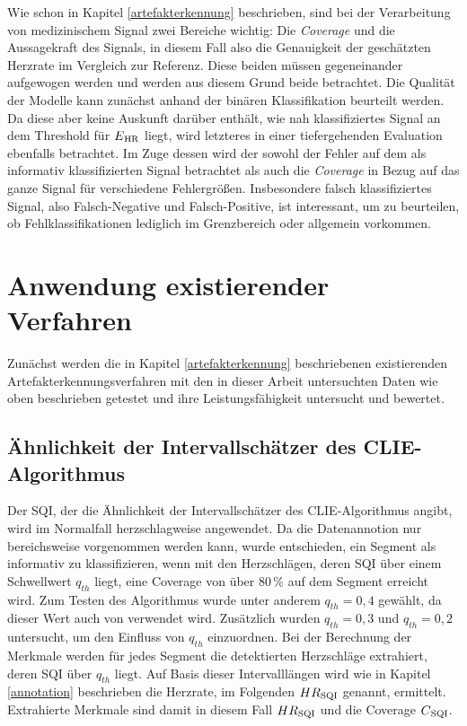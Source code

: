Wie schon in Kapitel \ref{artefakterkennung} beschrieben, sind bei der Verarbeitung von medizinischem Signal zwei Bereiche wichtig: Die \textit{Coverage} und die Aussagekraft des Signals, in diesem Fall also die Genauigkeit der geschätzten Herzrate im Vergleich zur Referenz. Diese beiden müssen gegeneinander aufgewogen werden und werden aus diesem Grund beide betrachtet. Die Qualität der Modelle kann zunächst anhand der binären Klassifikation beurteilt werden. Da diese aber keine Auskunft darüber enthält, wie nah klassifiziertes Signal an dem Threshold für $E\textsubscript{HR}$ liegt, wird letzteres in einer tiefergehenden Evaluation ebenfalls betrachtet. Im Zuge dessen wird der sowohl der Fehler auf dem als informativ klassifizierten Signal betrachtet als auch die \textit{Coverage} in Bezug auf das ganze Signal für verschiedene Fehlergrößen. Insbesondere falsch klassifiziertes Signal, also Falsch-Negative und Falsch-Positive, ist interessant, um zu beurteilen, ob Fehlklassifikationen lediglich im Grenzbereich oder allgemein vorkommen.

\section{Anwendung existierender Verfahren}

Zunächst werden die in Kapitel \ref{artefakterkennung} beschriebenen existierenden Artefakterkennungsverfahren mit den in dieser Arbeit untersuchten Daten wie oben beschrieben getestet und ihre Leistungsfähigkeit untersucht und bewertet.

\subsection{Ähnlichkeit der Intervallschätzer des CLIE-Algorithmus}

Der \ac{SQI}, der die Ähnlichkeit der Intervallschätzer des \ac{CLIE}-Algorithmus angibt, wird im Normalfall herzschlagweise angewendet. Da die Datenannotion nur bereichsweise vorgenommen werden kann, wurde entschieden, ein Segment als informativ zu klassifizieren, wenn mit den Herzschlägen, deren \ac{SQI} über einem Schwellwert $q_{th}$ liegt, eine Coverage von über 80\,\% auf dem Segment erreicht wird. Zum Testen des Algorithmus wurde unter anderem $q_{th} = 0{,}4$ gewählt, da dieser Wert auch von \citeauthor{Zink2017} verwendet wird. Zusätzlich wurden $q_{th} = 0{,}3$ und $q_{th} = 0{,}2$ untersucht, um den Einfluss von $q_{th}$ einzuordnen. Bei der Berechnung der Merkmale werden für jedes Segment die detektierten Herzschläge extrahiert, deren \ac{SQI} über $q_{th}$ liegt. Auf Basis dieser Intervalllängen wird wie in Kapitel \ref{annotation} beschrieben die Herzrate, im Folgenden $HR\textsubscript{SQI}$ genannt, ermittelt. Extrahierte Merkmale sind damit in diesem Fall $HR\textsubscript{SQI}$ und die Coverage $C\textsubscript{SQI}$.

